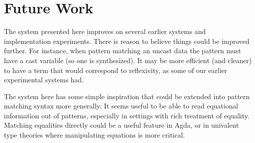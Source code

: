 
\section{Future Work}

The system presented here improves on several earlier systems and implementation experiments.
There is reason to believe things could be improved further.
For instance, when pattern matching an uncast data the pattern must have a cast variable (so one is synthesized).
It may be more efficient (and cleaner) to have a term that would correspond to reflexivity, as some of our earlier experimental systems had.


The system here has some simple inspiration that could be extended into pattern matching syntax more generally. 
It seems useful to be able to read equational information out of patterns, especially in settings with rich treatment of equality.
Matching equalities directly could be a useful feature in Agda, or in univalent type theories where manipulating equations is more critical.%

